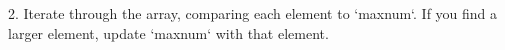 \documentclass[preview]{standalone}
\begin{document}
2. Iterate through the array, comparing each element to `maxnum`. If you find a larger element, update `maxnum` with that element.\\
\end{document}
